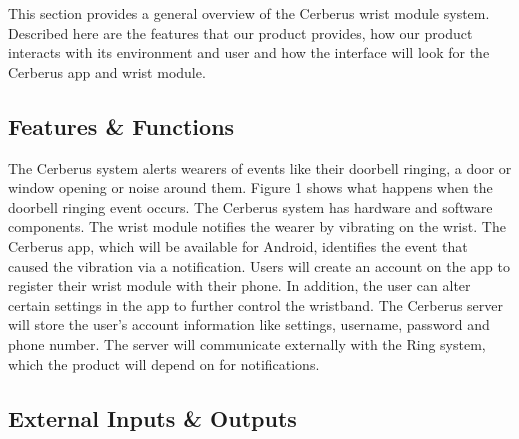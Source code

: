 
This section provides a general overview of the Cerberus wrist module system. Described here are the features that our product provides, how our product interacts with its environment and user and how the interface will look for the Cerberus app and wrist module.
\subsection{Features \& Functions}

The Cerberus system alerts wearers of events like their doorbell ringing, a door or window opening or noise around them. Figure 1 shows what happens when the doorbell ringing event occurs. The Cerberus system has hardware and software components. The wrist module notifies the wearer by vibrating on the wrist. The Cerberus app, which will be available for Android, identifies the event that caused the vibration via a notification. Users will create an account on the app to register their wrist module with their phone. In addition, the user can alter certain settings in the app to further control the wristband. The Cerberus server will store the user's account information like settings, username, password and phone number. The server will communicate externally with the Ring system, which the product will depend on for notifications. 

\subsection{External Inputs \& Outputs}


